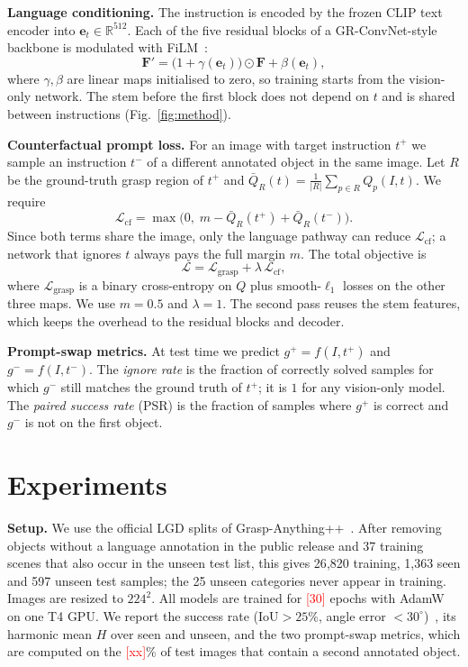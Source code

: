 \documentclass[10pt,twocolumn,letterpaper]{article}
\newcommand{\todo}[1]{\textcolor{red}{[#1]}}
\newcommand{\Lcf}{\mathcal{L}_{\mathrm{cf}}}
\newcommand{\Lgrasp}{\mathcal{L}_{\mathrm{grasp}}}
\begin{document}
\noindent\textbf{Language conditioning.}
The instruction is encoded by the frozen CLIP text encoder into
$\mathbf{e}_t\in\mathbb{R}^{512}$. Each of the five residual blocks of a
GR-ConvNet-style backbone is modulated with FiLM~\cite{perez2018film}:
\begin{equation}
  \mathbf{F}' = \bigl(1+\gamma(\mathbf{e}_t)\bigr)\odot\mathbf{F} + \beta(\mathbf{e}_t),
  \label{eq:film}
\end{equation}
where $\gamma,\beta$ are linear maps initialised to zero, so training starts
from the vision-only network. The stem before the first block does not depend
on $t$ and is shared between instructions (Fig.~\ref{fig:method}).

\noindent\textbf{Counterfactual prompt loss.}
For an image with target instruction $t^{+}$ we sample an instruction $t^{-}$
of a different annotated object in the same image. Let $R$ be the ground-truth
grasp region of $t^{+}$ and $\bar{Q}_R(t)=\tfrac{1}{|R|}\sum_{p\in R}Q_p(I,t)$. We require
\begin{equation}
  \Lcf = \max\bigl(0,\; m-\bar{Q}_R(t^{+})+\bar{Q}_R(t^{-})\bigr).
  \label{eq:cf}
\end{equation}
Since both terms share the image, only the language pathway can reduce
$\Lcf$; a network that ignores $t$ always pays the full margin $m$. The total
objective is
\begin{equation}
  \mathcal{L} = \Lgrasp + \lambda\,\Lcf ,
\end{equation}
where $\Lgrasp$ is a binary cross-entropy on $Q$ plus smooth-$\ell_1$ losses on
the other three maps. We use $m=0.5$ and $\lambda=1$. The second pass reuses the
stem features, which keeps the overhead to the residual blocks and decoder.

\noindent\textbf{Prompt-swap metrics.}
At test time we predict $g^{+}=f(I,t^{+})$ and $g^{-}=f(I,t^{-})$. The
\emph{ignore rate} is the fraction of correctly solved samples for which
$g^{-}$ still matches the ground truth of $t^{+}$; it is $1$ for any
vision-only model. The \emph{paired success rate} (PSR) is the fraction of
samples where $g^{+}$ is correct and $g^{-}$ is not on the first object.

\section{Experiments}
\noindent\textbf{Setup.}
We use the official LGD splits of Grasp-Anything++~\cite{vuong2024lgd}. After
removing objects without a language annotation in the public release and 37
training scenes that also occur in the unseen test list, this gives 26{,}820
training, 1{,}363 seen and 597 unseen test samples; the 25 unseen categories
never appear in training. Images are resized to $224^2$. All models are trained
for \todo{30} epochs with AdamW on one T4 GPU. We report the success rate
(IoU${>}25\%$, angle error ${<}30^{\circ}$)~\cite{jiang2011rectangle}, its
harmonic mean $H$ over seen and unseen, and the two prompt-swap metrics, which
are computed on the \todo{xx}\% of test images that contain a second annotated object.
\end{document}

